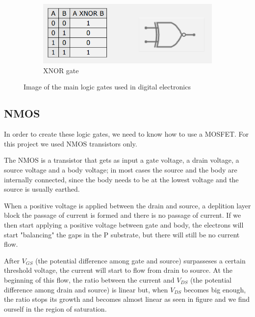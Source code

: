 \documentclass{article}
\begin{document}
\begin{figure}[h]
    \centering
    \begin{subfigure}{.49\textwidth}
        \centering
        \includegraphics[width=\linewidth]{IM_XNOR.PNG}
        \caption{XNOR gate}
        \label{XNOR}
    \end{subfigure}

\caption{Image of the main logic gates used in digital electronics}
\label{LogicGates}
\end{figure}


\subsection{NMOS}

In order to create these logic gates, we need to know how to use a MOSFET. For this project we used NMOS transistors only.

\vspace{3mm}

The NMOS is a transistor that gets as input a gate voltage, a drain voltage, a source voltage and a body voltage; in most cases the source and the body are internally connected, since the body needs to be at the lowest voltage and the source is usually earthed.

\vspace{3mm}

When a positive voltage is applied between the drain and source, a deplition layer block the passage of current is formed and there is no passage of current. 
If we then start applying a positive voltage between gate and body, the electrons will start "balancing" the gaps in the P substrate, but there will still be no current flow.

\vspace{3mm}

After $V_{GS}$ (the potential difference among gate and source) surpasseses a certain threshold voltage, the current will start to flow from drain to source. At the beginning of this flow, the ratio between the current and $V_{DS}$ (the potential difference among drain and source) is linear but, when $V_{DS}$ becomes big enough, the ratio stops its growth and becomes almost linear as seen in figure %
and we find ourself in the region of saturation.
\end{document}
